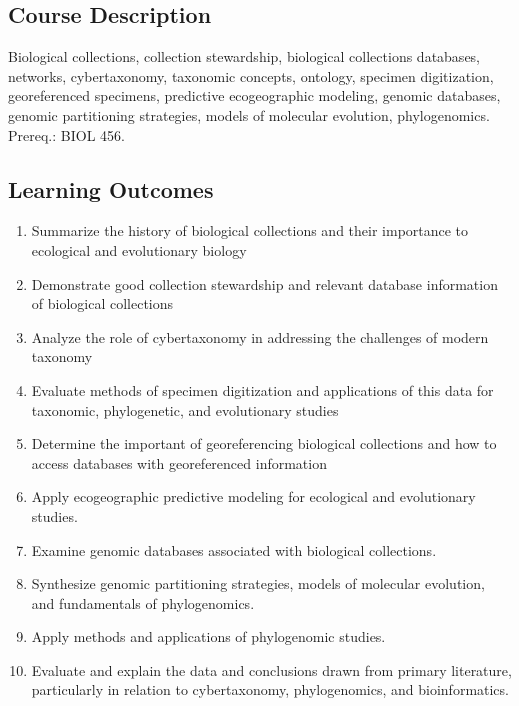 \documentclass{tufte-handout}
\begin{document}
\begin{fullwidth}

\section{Course Description}

Biological collections, collection stewardship, biological collections databases, networks, cybertaxonomy, taxonomic concepts, ontology, specimen digitization, georeferenced specimens, predictive ecogeographic modeling, genomic databases, genomic partitioning strategies, models of molecular evolution, phylogenomics. Prereq.: BIOL 456.

\subsection{Learning Outcomes}



\begin{enumerate}
	\item Summarize the history of biological collections and their importance to ecological and evolutionary biology
	\item Demonstrate good collection stewardship and relevant database information of biological collections
	\item Analyze the role of cybertaxonomy in addressing the challenges of modern taxonomy
	\item Evaluate methods of specimen digitization and applications of this data for taxonomic, phylogenetic, and evolutionary studies 
	\item Determine the important of georeferencing biological collections and how to access databases with georeferenced information
	\item Apply ecogeographic predictive modeling for ecological and evolutionary studies.
	\item Examine genomic databases associated with biological collections. 
	\item Synthesize genomic partitioning strategies, models of molecular evolution, and fundamentals of phylogenomics.
	\item Apply methods and applications of phylogenomic studies. 
	\item Evaluate and explain the data and conclusions drawn from primary literature, particularly in relation to cybertaxonomy, phylogenomics, and bioinformatics.
\end{enumerate}


\end{fullwidth}
\end{document}
